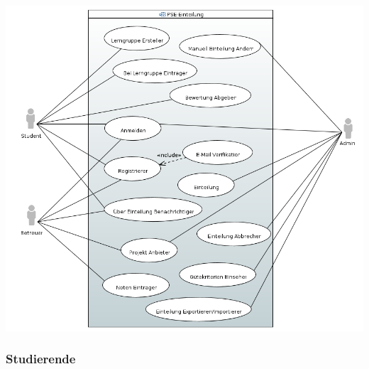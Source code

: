 \documentclass[parskip=full]{scrartcl}
\begin{document}
\includegraphics[width=\linewidth]{diagramme_pflichtenheft/UseCase_Diagram.PNG}

\subsubsection{Studierende}
\end{document}
